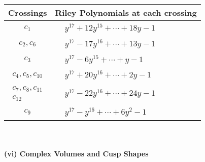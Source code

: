 \documentclass[1p]{elsarticle_modified}
\theoremstyle{definition}
\begin{document}
\begin{tabular}{m{50pt}|m{274pt}}
Crossings & \hspace{64pt}Riley Polynomials at each crossing \\
\hline $$\begin{aligned}c_{1}\end{aligned}$$&$\begin{aligned}
&y^{17}+12 y^{15}+\cdots+18 y-1
\end{aligned}$\\
\hline $$\begin{aligned}c_{2},c_{6}\end{aligned}$$&$\begin{aligned}
&y^{17}-17 y^{16}+\cdots+13 y-1
\end{aligned}$\\
\hline $$\begin{aligned}c_{3}\end{aligned}$$&$\begin{aligned}
&y^{17}-6 y^{15}+\cdots+y-1
\end{aligned}$\\
\hline $$\begin{aligned}c_{4},c_{5},c_{10}\end{aligned}$$&$\begin{aligned}
&y^{17}+20 y^{16}+\cdots+2 y-1
\end{aligned}$\\
\hline $$\begin{aligned}c_{7},c_{8},c_{11}\\c_{12}\end{aligned}$$&$\begin{aligned}
&y^{17}-22 y^{16}+\cdots+24 y-1
\end{aligned}$\\
\hline $$\begin{aligned}c_{9}\end{aligned}$$&$\begin{aligned}
&y^{17}- y^{16}+\cdots+6 y^2-1
\end{aligned}$\\
\hline
\end{tabular}\\~\\
\newpage\flushleft \textbf{(vi) Complex Volumes and Cusp Shapes}
\end{document}
